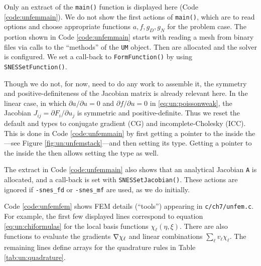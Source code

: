 
Only an extract of the \texttt{main()} function is displayed here (Code \ref{code:unfemmain}).  We do not show the first actions of \texttt{main()}, which are to read options and choose appropriate functions $a,f,g_D,g_N$ for the problem case.  The portion shown in Code \ref{code:unfemmain} starts with reading a mesh from \PETSc binary files via calls to the ``methods'' of the \texttt{UM} object.  Then \pVecs are allocated and the \pSNES solver is configured.  We set a call-back to \texttt{FormFunction()} by using \texttt{SNESSetFunction()}.


Though we do not, for now, need to do any work to assemble it, the symmetry and positive-definiteness of the Jacobian matrix is already relevant here.  In the linear case, in which $\partial a/\partial u=0$ and $\partial f/\partial u=0$ in \eqref{eq:un:poissonweak}, the Jacobian $J_{ij} = \partial F_i/\partial u_j$ is symmetric and positive-definite.  Thus we reset the default \pKSP and \pPC types to conjugate gradient (CG) and incomplete-Cholesky (ICC).  This is done in Code \ref{code:unfemmain} by first getting a pointer to the \pKSP inside the \pSNES---see Figure \ref{fig:un:unfemstack}---and then setting its type.  Getting a pointer to the \pPC inside the \pKSP then allows setting the \pPC type as well.

The extract in Code \ref{code:unfemmain} also shows that an analytical Jacobian \pMat \texttt{A} is allocated, and a \pSNES call-back is set with \texttt{SNESSetJacobian()}.  These actions are ignored if \texttt{-snes\_fd} or \texttt{-snes\_mf} are used, as we do initially.


Code \ref{code:unfemfem} shows FEM details (``tools'') appearing in \texttt{c/ch7/unfem.c}.  For example, the first few displayed lines correspond to equation \eqref{eq:un:chiformulas} for the local basis functions $\chi_\ell(\eta,\xi)$.  There are also functions to evaluate the gradients $\nabla \chi_\ell$ and linear combinations $\sum_\ell v_\ell \chi_\ell$.  The remaining lines define arrays for the quadrature rules in Table \ref{tab:un:quadrature}.

